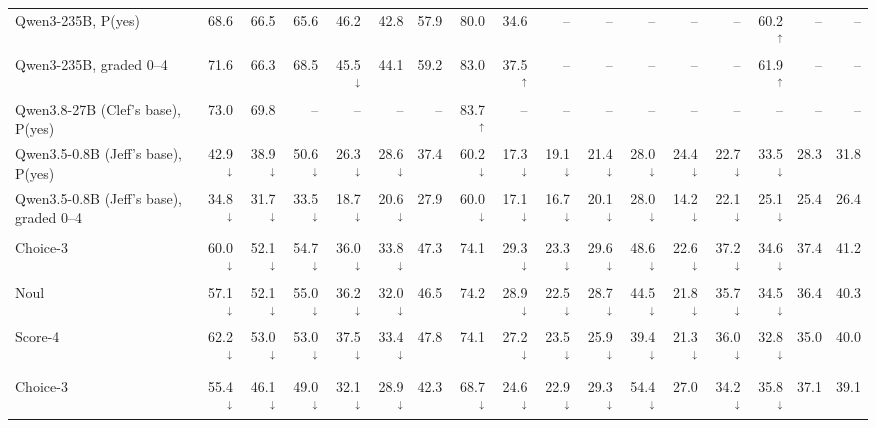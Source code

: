 \begin{table}[t]
\begin{tabular}{lrrrrr|r|rrrrrrrr|r|r}
Qwen3-235B, P(yes) & 68.6 & 66.5 & 65.6 & 46.2 & 42.8 & 57.9 & 80.0 & 34.6 & -- & -- & -- & -- & -- & 60.2$^\uparrow$ & -- & -- \\
Qwen3-235B, graded 0--4 & 71.6 & 66.3 & 68.5 & 45.5$^\downarrow$ & 44.1 & 59.2 & 83.0 & 37.5$^\uparrow$ & -- & -- & -- & -- & -- & 61.9$^\uparrow$ & -- & -- \\
Qwen3.8-27B (Clef's base), P(yes) & 73.0 & 69.8 & -- & -- & -- & -- & 83.7$^\uparrow$ & -- & -- & -- & -- & -- & -- & -- & -- & -- \\
Qwen3.5-0.8B (Jeff's base), P(yes) & 42.9$^\downarrow$ & 38.9$^\downarrow$ & 50.6$^\downarrow$ & 26.3$^\downarrow$ & 28.6$^\downarrow$ & 37.4 & 60.2$^\downarrow$ & 17.3$^\downarrow$ & 19.1$^\downarrow$ & 21.4$^\downarrow$ & 28.0$^\downarrow$ & 24.4$^\downarrow$ & 22.7$^\downarrow$ & 33.5$^\downarrow$ & 28.3 & 31.8 \\
Qwen3.5-0.8B (Jeff's base), graded 0--4 & 34.8$^\downarrow$ & 31.7$^\downarrow$ & 33.5$^\downarrow$ & 18.7$^\downarrow$ & 20.6$^\downarrow$ & 27.9 & 60.0$^\downarrow$ & 17.1$^\downarrow$ & 16.7$^\downarrow$ & 20.1$^\downarrow$ & 28.0$^\downarrow$ & 14.2$^\downarrow$ & 22.1$^\downarrow$ & 25.1$^\downarrow$ & 25.4 & 26.4 \\
\addlinespace[1pt]
\multicolumn{17}{l}{\textit{Laya (421M)}} \\
\quad Choice-3 & 60.0$^\downarrow$ & 52.1$^\downarrow$ & 54.7$^\downarrow$ & 36.0$^\downarrow$ & 33.8$^\downarrow$ & 47.3 & 74.1 & 29.3$^\downarrow$ & 23.3$^\downarrow$ & 29.6$^\downarrow$ & 48.6$^\downarrow$ & 22.6$^\downarrow$ & 37.2$^\downarrow$ & 34.6$^\downarrow$ & 37.4 & 41.2 \\
\quad Noul & 57.1$^\downarrow$ & 52.1$^\downarrow$ & 55.0$^\downarrow$ & 36.2$^\downarrow$ & 32.0$^\downarrow$ & 46.5 & 74.2 & 28.9$^\downarrow$ & 22.5$^\downarrow$ & 28.7$^\downarrow$ & 44.5$^\downarrow$ & 21.8$^\downarrow$ & 35.7$^\downarrow$ & 34.5$^\downarrow$ & 36.4 & 40.3 \\
\quad Score-4 & 62.2$^\downarrow$ & 53.0$^\downarrow$ & 53.0$^\downarrow$ & 37.5$^\downarrow$ & 33.4$^\downarrow$ & 47.8 & 74.1 & 27.2$^\downarrow$ & 23.5$^\downarrow$ & 25.9$^\downarrow$ & 39.4$^\downarrow$ & 21.3$^\downarrow$ & 36.0$^\downarrow$ & 32.8$^\downarrow$ & 35.0 & 40.0 \\
\addlinespace[1pt]
\multicolumn{17}{l}{\textit{Jeff (0.8B)}} \\
\quad Choice-3 & 55.4$^\downarrow$ & 46.1$^\downarrow$ & 49.0$^\downarrow$ & 32.1$^\downarrow$ & 28.9$^\downarrow$ & 42.3 & 68.7$^\downarrow$ & 24.6$^\downarrow$ & 22.9$^\downarrow$ & 29.3$^\downarrow$ & 54.4$^\downarrow$ & 27.0 & 34.2$^\downarrow$ & 35.8$^\downarrow$ & 37.1 & 39.1 \\

\end{tabular}
\end{table}
